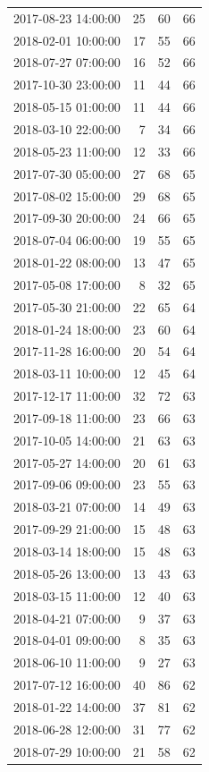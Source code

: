 \begin{tabular}{lrrr}
2017-08-23 14:00:00 & 25 & 60 & 66 \\
2018-02-01 10:00:00 & 17 & 55 & 66 \\
2018-07-27 07:00:00 & 16 & 52 & 66 \\
2017-10-30 23:00:00 & 11 & 44 & 66 \\
2018-05-15 01:00:00 & 11 & 44 & 66 \\
2018-03-10 22:00:00 & 7 & 34 & 66 \\
2018-05-23 11:00:00 & 12 & 33 & 66 \\
2017-07-30 05:00:00 & 27 & 68 & 65 \\
2017-08-02 15:00:00 & 29 & 68 & 65 \\
2017-09-30 20:00:00 & 24 & 66 & 65 \\
2018-07-04 06:00:00 & 19 & 55 & 65 \\
2018-01-22 08:00:00 & 13 & 47 & 65 \\
2017-05-08 17:00:00 & 8 & 32 & 65 \\
2017-05-30 21:00:00 & 22 & 65 & 64 \\
2018-01-24 18:00:00 & 23 & 60 & 64 \\
2017-11-28 16:00:00 & 20 & 54 & 64 \\
2018-03-11 10:00:00 & 12 & 45 & 64 \\
2017-12-17 11:00:00 & 32 & 72 & 63 \\
2017-09-18 11:00:00 & 23 & 66 & 63 \\
2017-10-05 14:00:00 & 21 & 63 & 63 \\
2017-05-27 14:00:00 & 20 & 61 & 63 \\
2017-09-06 09:00:00 & 23 & 55 & 63 \\
2018-03-21 07:00:00 & 14 & 49 & 63 \\
2017-09-29 21:00:00 & 15 & 48 & 63 \\
2018-03-14 18:00:00 & 15 & 48 & 63 \\
2018-05-26 13:00:00 & 13 & 43 & 63 \\
2018-03-15 11:00:00 & 12 & 40 & 63 \\
2018-04-21 07:00:00 & 9 & 37 & 63 \\
2018-04-01 09:00:00 & 8 & 35 & 63 \\
2018-06-10 11:00:00 & 9 & 27 & 63 \\
2017-07-12 16:00:00 & 40 & 86 & 62 \\
2018-01-22 14:00:00 & 37 & 81 & 62 \\
2018-06-28 12:00:00 & 31 & 77 & 62 \\
2018-07-29 10:00:00 & 21 & 58 & 62 \\

\end{tabular}
